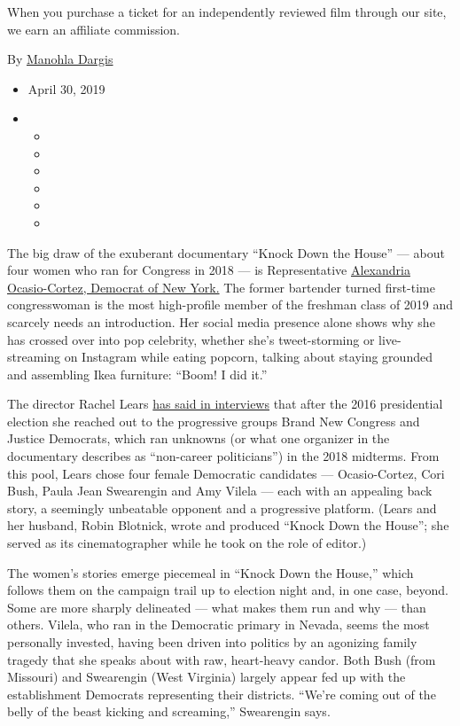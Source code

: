 When you purchase a ticket for an independently reviewed film through
our site, we earn an affiliate commission.

By \href{https://www.nytimes.com/by/manohla-dargis}{Manohla Dargis}

\begin{itemize}
\item
  April 30, 2019
\item
  \begin{itemize}
  \item
  \item
  \item
  \item
  \item
  \item
  \end{itemize}
\end{itemize}

The big draw of the exuberant documentary ``Knock Down the House'' ---
about four women who ran for Congress in 2018 --- is Representative
\href{https://ocasio-cortez.house.gov/}{Alexandria Ocasio-Cortez,
Democrat of New York.} The former bartender turned first-time
congresswoman is the most high-profile member of the freshman class of
2019 and scarcely needs an introduction. Her social media presence alone
shows why she has crossed over into pop celebrity, whether she's
tweet-storming or live-streaming on Instagram while eating popcorn,
talking about staying grounded and assembling Ikea furniture: ``Boom! I
did it.''

The director Rachel Lears
\href{https://www.missourireview.com/true-false-film-festival-an-interview-with-rachel-lears/}{has
said in interviews} that after the 2016 presidential election she
reached out to the progressive groups Brand New Congress and Justice
Democrats, which ran unknowns (or what one organizer in the documentary
describes as ``non-career politicians'') in the 2018 midterms. From this
pool, Lears chose four female Democratic candidates --- Ocasio-Cortez,
Cori Bush, Paula Jean Swearengin and Amy Vilela --- each with an
appealing back story, a seemingly unbeatable opponent and a progressive
platform. (Lears and her husband, Robin Blotnick, wrote and produced
``Knock Down the House''; she served as its cinematographer while he
took on the role of editor.)

The women's stories emerge piecemeal in ``Knock Down the House,'' which
follows them on the campaign trail up to election night and, in one
case, beyond. Some are more sharply delineated --- what makes them run
and why --- than others. Vilela, who ran in the Democratic primary in
Nevada, seems the most personally invested, having been driven into
politics by an agonizing family tragedy that she speaks about with raw,
heart-heavy candor. Both Bush (from Missouri) and Swearengin (West
Virginia) largely appear fed up with the establishment Democrats
representing their districts. ``We're coming out of the belly of the
beast kicking and screaming,'' Swearengin says.

